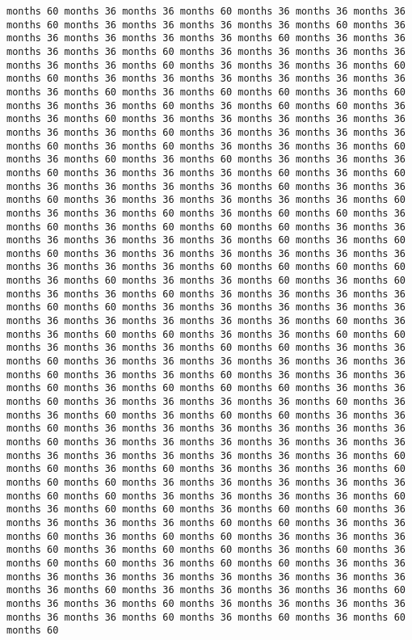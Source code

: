 \documentclass[11pt]{article}
\begin{document}
\begin{Verbatim}[commandchars=\\\{\}, frame=single, framerule=2mm, rulecolor=\color{outerrorbackground}]
months 60 months 36 months 36 months 60 months 36 months 36 months 36 months 60 months 36 months 36 months 36 months 36 months 60 months 36 months 36 months 36 months 36 months 36 months 60 months 36 months 36 months 36 months 36 months 60 months 36 months 36 months 36 months 36 months 36 months 36 months 60 months 36 months 36 months 36 months 60 months 60 months 36 months 36 months 36 months 36 months 36 months 36 months 36 months 60 months 36 months 60 months 60 months 36 months 60 months 36 months 36 months 60 months 36 months 60 months 60 months 36 months 36 months 60 months 36 months 36 months 36 months 36 months 36 months 36 months 36 months 60 months 36 months 36 months 36 months 36 months 60 months 36 months 60 months 36 months 36 months 36 months 60 months 36 months 60 months 36 months 60 months 36 months 36 months 36 months 60 months 36 months 36 months 36 months 60 months 36 months 60 months 36 months 36 months 36 months 36 months 60 months 36 months 36 months 60 months 36 months 36 months 36 months 36 months 36 months 60 months 36 months 36 months 60 months 36 months 60 months 60 months 36 months 60 months 36 months 60 months 60 months 60 months 36 months 36 months 36 months 36 months 36 months 36 months 60 months 36 months 60 months 60 months 36 months 36 months 36 months 36 months 36 months 36 months 36 months 36 months 36 months 60 months 60 months 60 months 60 months 36 months 60 months 36 months 36 months 60 months 36 months 60 months 36 months 36 months 60 months 36 months 36 months 36 months 36 months 60 months 60 months 36 months 36 months 36 months 36 months 36 months 36 months 36 months 36 months 36 months 36 months 60 months 36 months 36 months 60 months 60 months 36 months 36 months 60 months 60 months 36 months 36 months 36 months 60 months 60 months 36 months 36 months 60 months 36 months 36 months 36 months 36 months 36 months 36 months 60 months 36 months 36 months 60 months 36 months 36 months 36 months 60 months 36 months 60 months 60 months 60 months 36 months 36 months 60 months 36 months 36 months 36 months 36 months 60 months 36 months 36 months 60 months 36 months 60 months 60 months 36 months 36 months 60 months 36 months 36 months 36 months 36 months 36 months 36 months 60 months 36 months 36 months 36 months 36 months 36 months 36 months 36 months 36 months 36 months 36 months 36 months 36 months 60 months 60 months 36 months 60 months 36 months 36 months 36 months 60 months 60 months 60 months 36 months 36 months 36 months 36 months 36 months 60 months 60 months 36 months 36 months 36 months 36 months 60 months 36 months 60 months 60 months 36 months 60 months 60 months 36 months 36 months 36 months 36 months 60 months 60 months 36 months 36 months 60 months 36 months 60 months 60 months 36 months 36 months 36 months 60 months 36 months 60 months 60 months 36 months 60 months 36 months 60 months 60 months 36 months 60 months 60 months 36 months 36 months 36 months 36 months 36 months 36 months 36 months 36 months 36 months 36 months 60 months 36 months 36 months 36 months 36 months 60 months 36 months 36 months 60 months 36 months 36 months 36 months 36 months 36 months 36 months 60 months 36 months 60 months 36 months 60 months 60 
\end{Verbatim}
\end{document}
